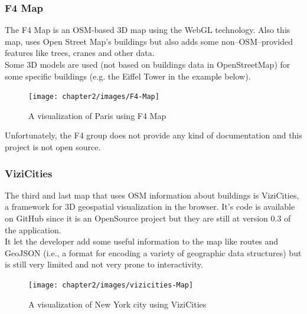 \subsubsection{F4 Map}
The F4 Map is an OSM-based 3D map using the WebGL technology. Also this map, uses Open Street Map's buildings but also adds some non--OSM--provided features like trees, cranes and other data.\\
 Some 3D models are used (not based on buildings data in OpenStreetMap) for some specific buildings (e.g. the Eiffel Tower in the example below).
\begin{figure}[H]
\centering
\texttt{[image: chapter2/images/F4-Map]}
\caption{A visualization of Paris using F4 Map}
\label{fig:F4-Map}
\end{figure}
Unfortunately, the F4 group does not provide any kind of documentation and this project is not open source.
\subsubsection{ViziCities}
The third and last map that uses OSM information about buildings is ViziCities, a framework for 3D geospatial visualization in the browser. It's code is available on GitHub since it is an OpenSource project but they are still at version 0.3 of the application.\\It let the developer add some useful information to the map like routes and GeoJSON (i.e., a format for encoding a variety of geographic data structures) but is still very limited and not very prone to interactivity.
\begin{figure}[H]
\centering
\texttt{[image: chapter2/images/vizicities-Map]}
\caption{A visualization of New York city using ViziCities}
\label{fig:vizicities-Map}
\end{figure}


